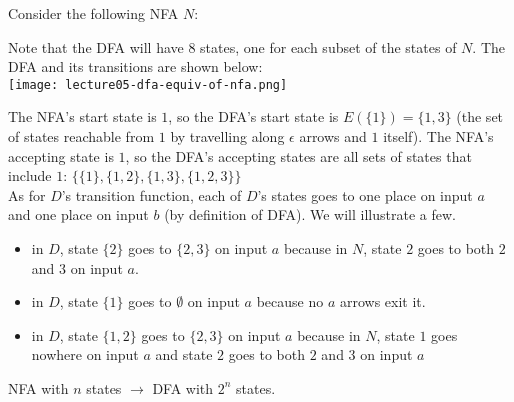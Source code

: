 \documentclass[11pt,a4paper]{article}
\begin{document}
\begin{example}
    Consider the following NFA $N$:


    Note that the DFA will have 8 states, one for each subset of the states of $N$. The DFA and its transitions are shown below: \\

    \texttt{[image: lecture05-dfa-equiv-of-nfa.png]}

    The NFA's start state is $1$, so the DFA's start state is $E(\{1\})=\{1,3\}$ (the set of states reachable from $1$ by travelling along $\epsilon$ arrows and $1$ itself).
    The NFA's accepting state is $1$, so the DFA's accepting states are all sets of states that include $1$: $\{\{1\}, \{1,2\},\{1,3\},\{1,2,3\}\}$ \\

    As for $D$'s transition function, each of $D$'s states goes to one place on input $a$ and one place on input $b$ (by definition of DFA). We will illustrate a few.

    \begin{itemize}
        \item in $D$, state $\{2\}$ goes to $\{2,3\}$ on input $a$ because in $N$, state $2$ goes to both $2$ and $3$ on input $a$.
        \item in $D$, state $\{1\}$ goes to $\emptyset$ on input $a$ because no $a$ arrows exit it.
        \item in $D$, state $\{1,2\}$ goes to $\{2,3\}$ on input $a$ because in $N$, state $1$ goes nowhere on input $a$ and state $2$ goes to both $2$ and $3$ on input $a$
    \end{itemize}

    NFA with $n$ states $\rightarrow$ DFA with $2^n$ states.
\end{example}
\end{document}
